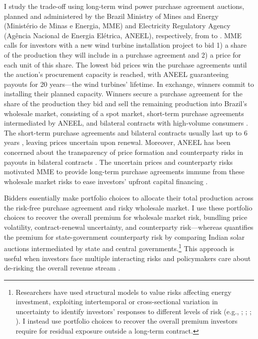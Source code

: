 \documentclass[12pt]{article}
\theoremstyle{definition} %
\begin{document}
I study the trade-off using long-term wind power purchase agreement auctions, planned and administered by the Brazil Ministry of Mines and Energy (Minist\'erio de Minas e Energia, MME) and Electricity Regulatory Agency (Ag\^encia Nacional de Energia El\'etrica, ANEEL), respectively, from  to . MME calls for investors with a new wind turbine installation project to bid 1) a share of the production they will include in a purchase agreement and 2) a price for each unit of this share. The lowest bid prices win the purchase agreements until the auction's procurement capacity is reached, with ANEEL guaranteeing payouts for 20 years---the wind turbines' lifetime. In exchange, winners commit to installing their planned capacity. Winners secure a purchase agreement for the share of the production they bid and sell the remaining production into Brazil's wholesale market, consisting of a spot market, short-term purchase agreements intermediated by ANEEL, and bilateral contracts with high-volume consumers \citep{Hochberg2021}. The short-term purchase agreements and bilateral contracts usually last up to 6 years \citep{CCEE2024,Perez2024}, leaving prices uncertain upon renewal. Moreover, ANEEL has been concerned about the transparency of price formation and counterparty risks in payouts in bilateral contracts \citep{CCEE2012}. The uncertain prices and counterparty risks motivated MME to provide long-term purchase agreements immune from these wholesale market risks to ease investors' upfront capital financing \citep{Tolmasquim2021}.

Bidders essentially make portfolio choices to allocate their total production across the risk-free purchase agreement and risky wholesale market. I use these portfolio choices to recover the overall premium for wholesale market risk, bundling price volatility, contract-renewal uncertainty, and counterparty risk---whereas \citet{Ryan2026} quantifies the premium for state-government counterparty risk by comparing Indian solar auctions intermediated by state and central governments.\footnote{
Researchers have used structural models to value risks affecting energy investment, exploiting intertemporal or cross-sectional variation in uncertainty to identify investors' responses to different levels of risk (e.g., \citealp{Kellogg2014}; \citealp{Chen2024}; \citealp*{Gowrisankaran2025}; \citealp{Ryan2026}). I instead use portfolio choices to recover the overall premium investors require for residual exposure outside a long-term contract.
} This approach is useful when investors face multiple interacting risks and policymakers care about de-risking the overall revenue stream \citep{Fabra2025a}.
\end{document}
